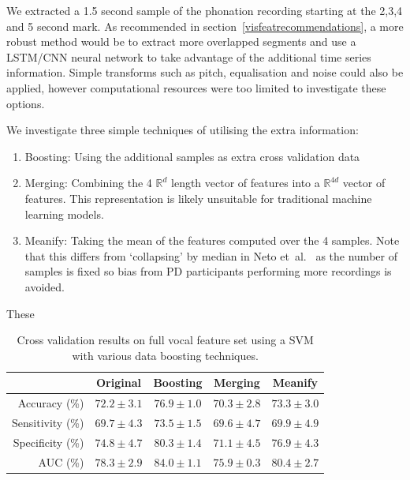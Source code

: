 \documentclass[12pt, twoside]{book}
\begin{document}
We extracted a 1.5 second sample of the phonation recording starting at the 2,3,4 and 5 second mark. As recommended in section~\ref{visfeatrecommendations}, a more robust method would be to extract more overlapped segments and use a LSTM/CNN neural network to take advantage of the additional time series information. Simple transforms such as pitch, equalisation and noise could also be applied, however computational resources were too limited to investigate these options. 


We investigate three simple techniques of utilising the extra information:
\begin{enumerate}
	\item Boosting: Using the additional samples as extra cross validation data
	\item Merging: Combining the 4 $\mathbb{R}^d$ length vector of features into a $\mathbb{R}^{4d}$ vector of features. This representation is likely unsuitable for traditional machine learning models.
	\item Meanify: Taking the mean of the features computed over the 4 samples. Note that this differs from `collapsing' by median in Neto et~al.~\cite{mpowerneto2017analysis} as the number of samples is fixed so bias from PD participants performing more recordings is avoided. 
\end{enumerate}

These 



\begin{table}[h]
	\caption{Cross validation results on full vocal feature set using a SVM with various data boosting techniques.}
	\label{speechboost}
	\centering
	\begin{tabular}{@{}rcccc@{}}
		&  Original & Boosting & Merging & Meanify \\ \midrule
		Accuracy (\%)    &      $72.2\pm3.1$ &                       $76.9\pm1.0$                                  &     		$70.3\pm2.8$
		&						$73.3\pm3.0$\\ \midrule
		Sensitivity (\%) &       $69.7\pm4.3$ &                       $73.5\pm1.5$                                  &    		$69.6\pm4.7$
		&					    $69.9\pm4.9$\\ \midrule
		Specificity (\%) &      $74.8\pm4.7$ &                       $80.3\pm1.4$                                  &    		$71.1\pm4.5$
		&					    $76.9\pm4.3$\\ \midrule
		AUC (\%)         &      $78.3\pm2.9$ &                       $84.0\pm1.1$                                  &     		$75.9\pm0.3$
		&				 		$80.4\pm2.7$\\ \midrule
	\end{tabular}
\end{table}
\end{document}
